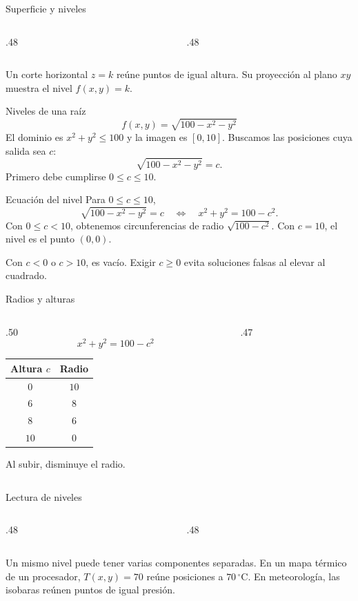 \begin{frame}{Superficie y niveles}
\begin{columns}[c]
\begin{column}{.48\textwidth}\end{column}
\begin{column}{.48\textwidth}\end{column}
\end{columns}
Un corte horizontal $z=k$ reúne puntos de igual altura. Su proyección al plano $xy$ muestra el nivel $f(x,y)=k$.
\end{frame}
\begin{frame}{Niveles de una raíz}
\[f(x,y)=\sqrt{100-x^2-y^2}\]
El dominio es $x^2+y^2\le100$ y la imagen es $[0,10]$.
\medskip
Buscamos las posiciones cuya salida sea $c$:
\[\sqrt{100-x^2-y^2}=c.\]
Primero debe cumplirse $0\le c\le10$.
\end{frame}
\begin{frame}{Ecuación del nivel}
Para $0\le c\le10$,
\[\sqrt{100-x^2-y^2}=c
\quad\Longleftrightarrow\quad x^2+y^2=100-c^2.\]
Con $0\le c<10$, obtenemos circunferencias de radio $\sqrt{100-c^2}$.
\medskip
Con $c=10$, el nivel es el punto $(0,0)$.

Con $c<0$ o $c>10$, es vacío.
\medskip
Exigir $c\ge0$ evita soluciones falsas al elevar al cuadrado.
\end{frame}
\begin{frame}{Radios y alturas}
\begin{columns}[c]
\begin{column}{.50\textwidth}
\[x^2+y^2=100-c^2\]
\begin{center}\begin{tabular}{cc}
Altura $c$ & Radio\\\hline
$0$ & $10$\\[2mm]
$6$ & $8$\\[2mm]
$8$ & $6$\\[2mm]
$10$ & $0$
\end{tabular}\end{center}
Al subir, disminuye el radio.
\end{column}
\begin{column}{.47\textwidth}\end{column}
\end{columns}
\end{frame}
\begin{frame}{Lectura de niveles}
\begin{columns}[c]
\begin{column}{.48\textwidth}\end{column}
\begin{column}{.48\textwidth}\end{column}
\end{columns}
Un mismo nivel puede tener varias componentes separadas.
\medskip
En un mapa térmico de un procesador, $T(x,y)=70$ reúne posiciones a $70\,{}^\circ\mathrm C$. En meteorología, las isobaras reúnen puntos de igual presión.
\end{frame}
